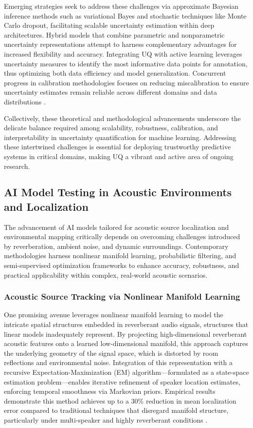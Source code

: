 Emerging strategies seek to address these challenges via approximate Bayesian inference methods such as variational Bayes and stochastic techniques like Monte Carlo dropout, facilitating scalable uncertainty estimation within deep architectures. Hybrid models that combine parametric and nonparametric uncertainty representations attempt to harness complementary advantages for increased flexibility and accuracy. Integrating UQ with active learning leverages uncertainty measures to identify the most informative data points for annotation, thus optimizing both data efficiency and model generalization. Concurrent progress in calibration methodologies focuses on reducing miscalibration to ensure uncertainty estimates remain reliable across different domains and data distributions \cite{ref28}.

Collectively, these theoretical and methodological advancements underscore the delicate balance required among scalability, robustness, calibration, and interpretability in uncertainty quantification for machine learning. Addressing these intertwined challenges is essential for deploying trustworthy predictive systems in critical domains, making UQ a vibrant and active area of ongoing research.

\subsection{AI Model Testing in Acoustic Environments and Localization}

The advancement of AI models tailored for acoustic source localization and environmental mapping critically depends on overcoming challenges introduced by reverberation, ambient noise, and dynamic surroundings. Contemporary methodologies harness nonlinear manifold learning, probabilistic filtering, and semi-supervised optimization frameworks to enhance accuracy, robustness, and practical applicability within complex, real-world acoustic scenarios.

\subsubsection{Acoustic Source Tracking via Nonlinear Manifold Learning}

One promising avenue leverages nonlinear manifold learning to model the intricate spatial structures embedded in reverberant audio signals, structures that linear models inadequately represent. By projecting high-dimensional reverberant acoustic features onto a learned low-dimensional manifold, this approach captures the underlying geometry of the signal space, which is distorted by room reflections and environmental noise. Integration of this representation with a recursive Expectation-Maximization (EM) algorithm—formulated as a state-space estimation problem—enables iterative refinement of speaker location estimates, enforcing temporal smoothness via Markovian priors. Empirical results demonstrate this method achieves up to a 30\% reduction in mean localization error compared to traditional techniques that disregard manifold structure, particularly under multi-speaker and highly reverberant conditions \cite{ref38}.

